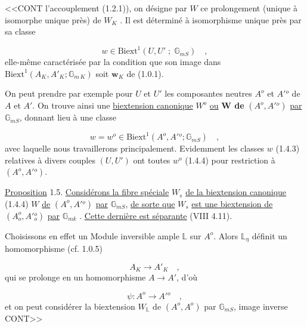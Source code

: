 
<<CONT l'accouplement (1.2.1)), on désigne par $W$ ce prolongement (unique à isomorphe unique près) de $W_K$ . Il est déterminé à isomorphisme unique près par sa classe

\begin{equation}\tag{1.4.3}
w \in \mathrm{Biext}^1(U,U' \; ; \; \mathbb{G}_{mS}) \quad ,
\end{equation}
elle-même caractérisée par la condition que son image dans $\mathrm{Biext}^1(A_K,A'_K;\mathbb{G}_{m\,K})$ soit $\mathbf{w}_K$ de (1.0.1).

On peut prendre par exemple pour $U$ et $U'$ les composantes neutres $A^o$ et $A'{}^o$ de $A$ et $A'$. On trouve ainsi une \underline{biextension canonique} $W^o$ \underline{ou} \textbf{W de} $(A^o,A'{}^o)$ \underline{par} $\mathbb{G}_{mS}$, donnant lieu à une classe

\begin{equation}\tag{1.4.4}
w = w^o \in \mathrm{Biext}^1(A^o,A'{}^o;\mathbb{G}_{mS}) \quad ,
\end{equation}
avec laquelle nous travaillerons principalement. Evidemment les classes $w$ (1.4.3) relatives à divers couples $(U,U')$ ont toutes $w^o$ (1.4.4) pour restriction à $(A^o,A'{}^o)$.

\underline{Proposition} 1.5. \underline{Considérons la fibre spéciale} $W_s$ \underline{de la biextension canonique} (1.4.4) $W$ \underline{de} $(A^o,A'{}^o)$ \underline{par} $\mathbb{G}_{mS}$, \underline{de sorte que} $W_s$ \underline{est une biextension de} $(A^o_o,A'{}^o_o)$ \underline{par} $\mathbb{G}_{mk}$ . \underline{Cette dernière est séparante} (VIII 4.11).

Choisissons en effet un Module inversible ample $\mathbb{L}$ sur $A^o$. Alors $\mathbb{L}_\eta$ définit un homomorphisme (cf. 1.0.5)

\begin{equation*}
A_K \longrightarrow A'_K \quad ,
\end{equation*}
qui se prolonge en un homomorphisme $A \longrightarrow A'$, d'où

\begin{equation*}
\psi : A^o \longrightarrow A'{}^o \quad ,
\end{equation*}
et on peut considérer la biextension $W_{\mathbb{L}}$ de $(A^o,A^o)$ par $\mathbb{G}_{mS}$, image inverse CONT>>



